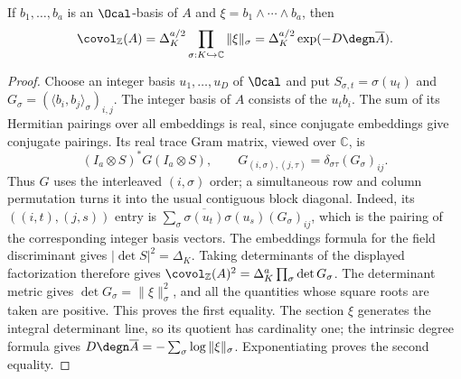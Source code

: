 \begin{lemma}
\label{lem:trace-covolume-free}
\leanok
If $b_1,\dots,b_a$ is an $\Ocal$-basis of $A$ and
$\xi=b_1\wedge\cdots\wedge b_a$, then
\[
 \covol_{\mathbb Z}(A)
 =\Delta_K^{a/2}\prod_{\sigma:K\hookrightarrow\mathbb C}\|\xi\|_\sigma
 =\Delta_K^{a/2}\exp(-D\degn\overline A).
\]
\end{lemma}
\begin{proof}
Choose an integer basis $u_1,\dots,u_D$ of $\Ocal$ and put
$S_{\sigma,t}=\sigma(u_t)$ and
$G_\sigma=(\langle b_i,b_j\rangle_\sigma)_{i,j}$.
The integer basis of $A$ consists of the $u_tb_i$.
The sum of its Hermitian pairings over all embeddings is real, since
conjugate embeddings give conjugate pairings. Its real trace Gram matrix,
viewed over $\mathbb C$, is
\[
 (I_a\otimes S)^*G(I_a\otimes S),
 \qquad G_{(i,\sigma),(j,\tau)}=\delta_{\sigma\tau}(G_\sigma)_{ij}.
\]
Thus $G$ uses the interleaved $(i,\sigma)$ order; a simultaneous row and
column permutation turns it into the usual contiguous block diagonal.
Indeed, its $((i,t),(j,s))$ entry is
$\sum_\sigma\overline{\sigma(u_t)}\sigma(u_s)(G_\sigma)_{ij}$,
which is the pairing of the corresponding integer basis vectors.
The embeddings formula for the field discriminant gives
$|\det S|^2=\Delta_K$. Taking determinants of the displayed factorization
therefore gives
$\covol_{\mathbb Z}(A)^2=\Delta_K^a\prod_\sigma\det G_\sigma$.
The determinant metric gives $\det G_\sigma=\|\xi\|_\sigma^2$,
and all the quantities whose square roots are taken are positive.
This proves the first equality. The section $\xi$ generates the integral
determinant line, so its quotient has cardinality one; the intrinsic
degree formula gives $D\degn\overline A=-\sum_\sigma\log\|\xi\|_\sigma$.
Exponentiating proves the second equality.
\end{proof}


